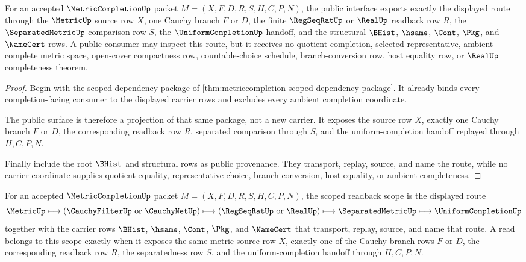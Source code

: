 \begin{theorem}
\label{thm:metric-completion-public-export-surface}
For an accepted $\MetricCompletionUp$ packet $M=(X,F,D,R,S,H,C,P,N)$, the public interface exports exactly the displayed route through the $\MetricUp$ source row $X$, one Cauchy branch $F$ or $D$, the finite $\RegSeqRatUp$ or $\RealUp$ readback row $R$, the $\SeparatedMetricUp$ comparison row $S$, the $\UniformCompletionUp$ handoff, and the structural $\BHist$, $\hsame$, $\Cont$, $\Pkg$, and $\NameCert$ rows. A public consumer may inspect this route, but it receives no quotient completion, selected representative, ambient complete metric space, open-cover compactness row, countable-choice schedule, branch-conversion row, host equality row, or $\RealUp$ completeness theorem.
\end{theorem}
\begin{proof}
Begin with the scoped dependency package of \autoref{thm:metriccompletion-scoped-dependency-package}. It already binds every completion-facing consumer to the displayed carrier rows and excludes every ambient completion coordinate.

The public surface is therefore a projection of that same package, not a new carrier. It exposes the source row $X$, exactly one Cauchy branch $F$ or $D$, the corresponding readback row $R$, separated comparison through $S$, and the uniform-completion handoff replayed through $H,C,P,N$.

Finally include the root $\BHist$ and structural rows as public provenance. They transport, replay, source, and name the route, while no carrier coordinate supplies quotient equality, representative choice, branch conversion, host equality, or ambient completeness.
\end{proof}

\begin{definition}
\label{def:metric-completion-scoped-readback-scope}
For an accepted $\MetricCompletionUp$ packet $M=(X,F,D,R,S,H,C,P,N)$, the scoped readback scope is the displayed route
$$
\MetricUp \longmapsto (\CauchyFilterUp\ \text{or}\ \CauchyNetUp) \longmapsto (\RegSeqRatUp\ \text{or}\ \RealUp) \longmapsto \SeparatedMetricUp \longmapsto \UniformCompletionUp
$$
together with the carrier rows $\BHist$, $\hsame$, $\Cont$, $\Pkg$, and $\NameCert$ that transport, replay, source, and name that route. A read belongs to this scope exactly when it exposes the same metric source row $X$, exactly one of the Cauchy branch rows $F$ or $D$, the corresponding readback row $R$, the separatedness row $S$, and the uniform-completion handoff through $H,C,P,N$.
\end{definition}


